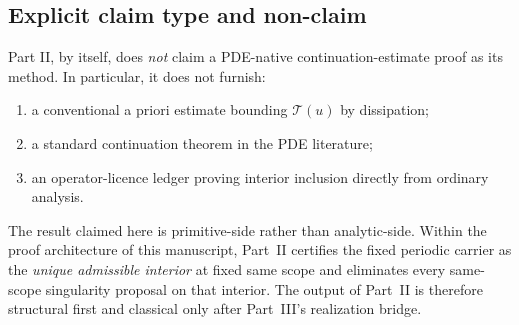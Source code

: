 \subsection{Explicit claim type and non-claim}
\begin{proposition}\label{prop:explicit-non-claim}
Part II, by itself, does \emph{not} claim a PDE-native continuation-estimate proof as its method. In particular, it does not furnish:
\begin{enumerate}[label=(\alph*), leftmargin=2.2em]
\item a conventional a priori estimate bounding $\mathcal T(u)$ by dissipation;
\item a standard continuation theorem in the PDE literature;
\item an operator-licence ledger proving interior inclusion directly from ordinary analysis.
\end{enumerate}
The result claimed here is primitive-side rather than analytic-side. Within the proof architecture of this manuscript, Part~II certifies the fixed periodic carrier as the \emph{unique admissible interior} at fixed same scope and eliminates every same-scope singularity proposal on that interior. The output of Part~II is therefore structural first and classical only after Part~III's realization bridge.
\end{proposition}

